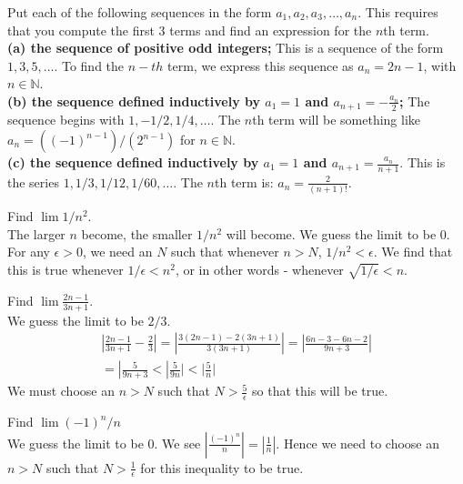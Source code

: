 \documentclass[12pt]{article}
\newcommand{\N}{\mathbb{N}}
\newenvironment{exercise}[2][Exercise]{\begin{trivlist}
\item[\hskip \labelsep {\bfseries #1}\hskip \labelsep {\bfseries #2.}]}{\end{trivlist}}
\begin{document}
\begin{exercise}{2.1.3}
Put each of the following sequences in the form $a_1, a_2, a_3, \hdots, a_n$. This requires that you compute the first 3 terms and find an expression for the $n$th term. \\
\textbf{(a) the sequence of positive odd integers;} This is a sequence of the form $1,3,5,\hdots$. To find the $n-th$ term, we express this sequence as $a_n = 2 n - 1$, with $n \in \N$. \\
\textbf{(b) the sequence defined inductively by $a_1 = 1$ and $a_{n+1} = - \frac{a_n}{2}$;} The sequence begins with $1, -1/2, 1/4, \hdots$. The $n$th term will be something like $a_n= ((-1)^{n-1})/(2^{n-1})$ for $n \in \N$. \\
\textbf{(c) the sequence defined inductively by $a_1 = 1$ and $a_{n+1} = \frac{a_n}{n+1}$}. This is the series $1, 1/3, 1/12, 1/60, \hdots$. The $n$th term is: $a_n = \frac{2}{(n+1)!}$.
\end{exercise}

\begin{exercise}{2.1.4}
Find $\lim 1/n^2$. \\

The larger $n$ become, the smaller $1/n^2$ will become. We guess the limit to be $0$. For any $\epsilon > 0$, we need an $N$ such that whenever $n > N$, $1/n^2 < \epsilon$. We find that this is true whenever $ 1/\epsilon < n^2$, or in other words - whenever $\sqrt{1/ \epsilon} < n$.
\end{exercise}


\begin{exercise}{2.1.5}
Find $\lim  \frac{2n-1}{3n+1}$. \\

We guess the limit to be $2/3$. 
	\begin{align*}
	|\frac{2n-1}{3n+1} - \frac{2}{3}| = | \frac{3(2n-1) - 2(3n+1)}{3(3n+1)}| = | \frac{6n-3-6n-2}{9n+3} |\\
	= |\frac{5}{9n+3} < | \frac{5}{9n} | < | \frac{5}{n} |
	\end{align*}
We must choose an $n > N$ such that $N> \frac{5}{\epsilon}$ so that this will be true.
\end{exercise}


\begin{exercise}{2.1.6}
Find $\lim (-1)^n /n$ \\

We guess the limit to be $0$. We see $| \frac{(-1)^n}{n}| = |\frac{1}{n}|$. Hence we need to choose an $n>N$ such that $N> \frac{1}{\epsilon}$ for this inequality to be true.
\end{exercise}
\end{document}
